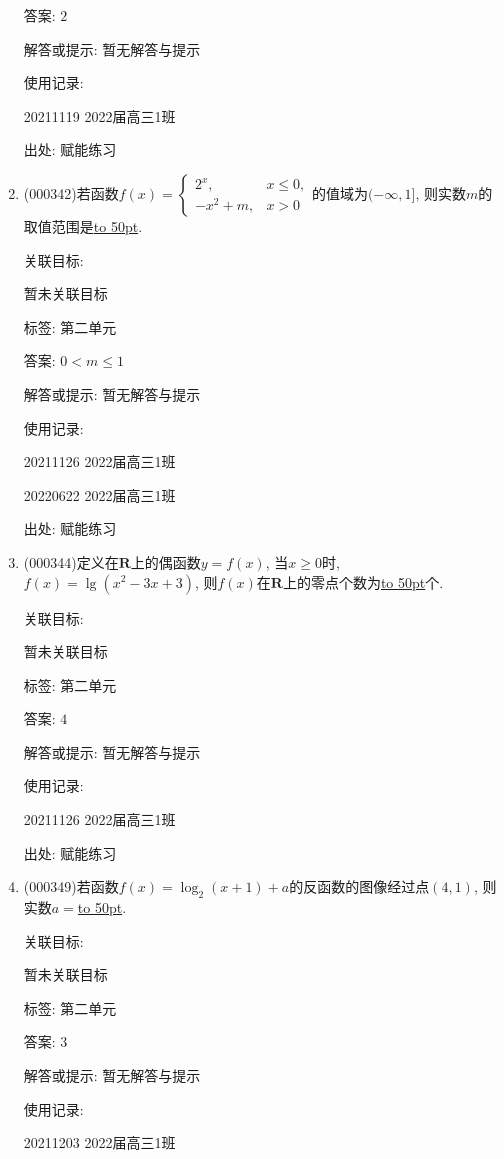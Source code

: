 \documentclass[10pt,a4paper]{article}
\newcommand{\blank}[1]{\underline{\hbox to #1pt{}}}
\begin{document}
\begin{enumerate}[1.]
答案: $2$

解答或提示: 暂无解答与提示

使用记录:

20211119	2022届高三1班	


出处: 赋能练习
\item { (000342)}若函数$f(x)=\begin{cases}    2^x, & x\le 0, \\ -x^2+m, & x>0 \end{cases}$的值域为$(-\infty ,1]$, 则实数$m$的取值范围是\blank{50}.


关联目标:

暂未关联目标



标签: 第二单元

答案: $0<m\le 1$

解答或提示: 暂无解答与提示

使用记录:

20211126	2022届高三1班	

20220622	2022届高三1班  	


出处: 赋能练习
\item { (000344)}定义在$\mathbf{R}$上的偶函数$y=f(x)$, 当$x\ge 0$时, $f(x)=\lg (x^2-3x+3)$, 则$f(x)$在$\mathbf{R}$上的零点个数为\blank{50}个.


关联目标:

暂未关联目标



标签: 第二单元

答案: $4$

解答或提示: 暂无解答与提示

使用记录:

20211126	2022届高三1班	


出处: 赋能练习
\item { (000349)}若函数$f(x)=\log_2 (x+1)+a$的反函数的图像经过点$(4,1)$, 则实数$a=$\blank{50}.


关联目标:

暂未关联目标



标签: 第二单元

答案: $3$

解答或提示: 暂无解答与提示

使用记录:

20211203	2022届高三1班	



\end{enumerate}
\end{document}
